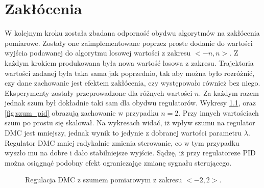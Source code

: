 \chapter{Zakłócenia}
W kolejnym kroku została zbadana odporność obydwu algorytmów na zakłócenia pomiarowe.
Zostały one zaimplementowane poprzez proste dodanie do wartości wyjścia podawanej
do algorytmu losowej wartości z zakresu $<-n, n>$. Z każdym krokiem produkowana była
nowa wartość losowa z zakresu. Trajektoria wartości zadanej była taka sama
jak poprzednio, tak aby można było rozróżnić, czy dane zachowanie jest efektem
zakłócenia, czy występowało również bez niego. Eksperymenty zostały przeprowadzone
dla różnych wartości $n$. Za każdym razem jednak szum był dokładnie taki sam dla obydwu regulatorów.
Wykresy \ref{fig:szum_dmc}, oraz \ref{fig:szum_pid} obrazują zachowanie w przypadku $n = 2$.
Przy innych wartościach szum po prostu się skalował. Na wykresach widać, iż
wpływ szumu na regulator DMC jest mniejszy, jednak wynik to jedynie z dobranej
wartości parametru $\lambda$. Regulator DMC mniej radykalnie zmienia sterowanie,
co w tym przypadku wyszło mu na dobre i dało stabilniejsze wyjście.
Sądzę, iż przy regulatoreze PID można osiągnąć podobny efekt ograniczając
zmianę sygnału sterującego.

\begin{figure}[tb]
\centering
{}
\caption{Regulacja DMC z szumem pomiarowym z zakresu $<-2, 2>$.}
\label{fig:szum_dmc}
\end{figure}


